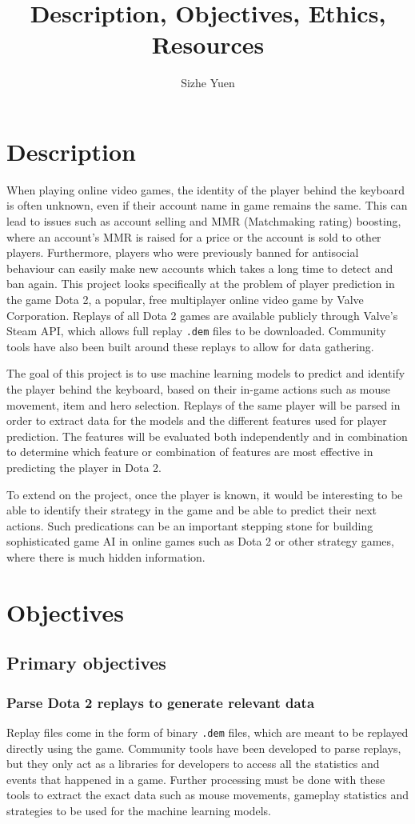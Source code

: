 \documentclass{sty/SizheArticle}
\title{Description, Objectives, Ethics, Resources}
\author{Sizhe Yuen}
\newcommand{\dota}{Dota 2}
\begin{document}

\section{Description}
When playing online video games, the identity of the player behind the keyboard is often unknown, even if their account name in game remains the same. This can lead to issues such as account selling and MMR (Matchmaking rating) boosting, where an account's MMR is raised for a price or the account is sold to other players. Furthermore, players who were previously banned  for antisocial behaviour can easily make new accounts which takes a long time to detect and ban again. This project looks specifically at the problem of player prediction in the game \dota{}, a popular, free multiplayer online video game by Valve Corporation. Replays of all \dota{} games are available publicly through Valve's Steam API, which allows full replay \texttt{.dem} files to be downloaded. Community tools have also been built around these replays to allow for data gathering. 

The goal of this project is to use machine learning models to predict and identify the player behind the keyboard, based on their in-game actions such as mouse movement, item and hero selection. Replays of the same player will be parsed in order to extract data for the models and the different features used for player prediction. The features will be evaluated both independently and in combination to determine which feature or combination of features are most effective in predicting the player in \dota{}. 

To extend on the project, once the player is known, it would be interesting to be able to identify their strategy in the game and be able to predict their next actions. Such predications can be an important stepping stone for building sophisticated game AI in online games such as \dota{} or other strategy games, where there is much hidden information. 

\section{Objectives}
\subsection{Primary objectives}

\subsubsection{Parse \dota{} replays to generate relevant data}
Replay files come in the form of binary \texttt{.dem} files, which are meant to be replayed directly using the game. Community tools have been developed to parse replays, but they only act as a libraries for developers to access all the statistics and events that happened in a game. Further processing must be done with these tools to extract the exact data such as mouse movements, gameplay statistics and strategies to be used for the machine learning models. 
\end{document}
